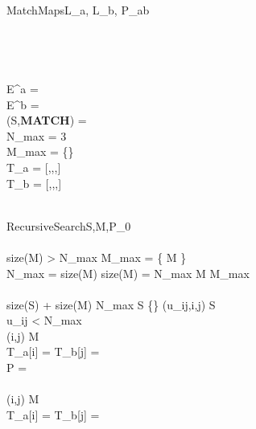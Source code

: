 \begin{pseudocode}{MatchMaps}{L_a, L_b, P_{ab}}
 \\
 \\
 \\
 \\
\\
 E^a = \\
 E^b = \\
 (S,{\bf MATCH}) = \\

 N_{max} = 3 \quad {} \\
 M_{max} = \{\}\\
 T_a = [\FALSE,\FALSE,\cdots,\FALSE]\\
 T_b = [\FALSE,\FALSE,\cdots,\FALSE]\\

 \\

\end{pseudocode}

\begin{pseudocode}{RecursiveSearch}{S,M,P_0}
 \\
 \\
 \IF size(M) > N_{max}\THEN
 \BEGIN
     M_{max} = \left\{ M \right\}\\
     N_{max} = size(M)
 \END
 \ELSEIF size(M) = N_{max}
 \BEGIN
     M \rightarrow M_{max}
 \END\\
 \\
 \WHILE size(S) + size(M) \ge N_{max} \AND S \ne \left\{\right\} \DO
 \BEGIN
      \left(u_{ij},i,j\right) \leftarrow S \\
      \IF u_{ij} < N_{max} \THEN
      \BEGIN
         \RETURN{}
      \END
\\
      \IF {} \THEN
      \BEGIN
         (i,j) \rightarrow M \\
         T_a[i] = T_b[j] = \TRUE\\
         P = \\
         \\
         (i,j) \leftarrow M\\
         T_a[i] = T_b[j] = \FALSE\\
      \END
 \END
\end{pseudocode}

